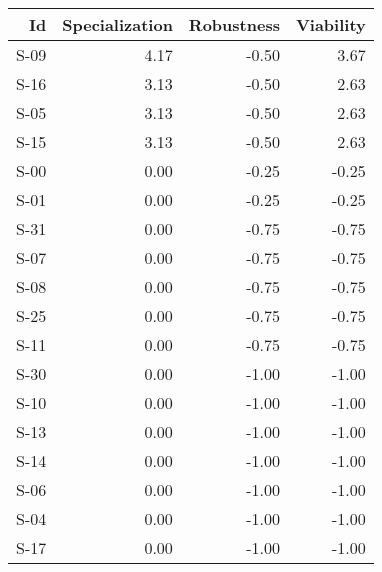 \begin{tabular}{ | r | r | r | r | }
    \hline
                    Id  &  Specialization  &      Robustness  &       Viability  \\
    \hline
    \hline
                  S-09  &            4.17  &           -0.50  &            3.67  \\
    \hline
                  S-16  &            3.13  &           -0.50  &            2.63  \\
    \hline
                  S-05  &            3.13  &           -0.50  &            2.63  \\
    \hline
                  S-15  &            3.13  &           -0.50  &            2.63  \\
    \hline
                  S-00  &            0.00  &           -0.25  &           -0.25  \\
    \hline
                  S-01  &            0.00  &           -0.25  &           -0.25  \\
    \hline
                  S-31  &            0.00  &           -0.75  &           -0.75  \\
    \hline
                  S-07  &            0.00  &           -0.75  &           -0.75  \\
    \hline
                  S-08  &            0.00  &           -0.75  &           -0.75  \\
    \hline
                  S-25  &            0.00  &           -0.75  &           -0.75  \\
    \hline
                  S-11  &            0.00  &           -0.75  &           -0.75  \\
    \hline
                  S-30  &            0.00  &           -1.00  &           -1.00  \\
    \hline
                  S-10  &            0.00  &           -1.00  &           -1.00  \\
    \hline
                  S-13  &            0.00  &           -1.00  &           -1.00  \\
    \hline
                  S-14  &            0.00  &           -1.00  &           -1.00  \\
    \hline
                  S-06  &            0.00  &           -1.00  &           -1.00  \\
    \hline
                  S-04  &            0.00  &           -1.00  &           -1.00  \\
    \hline
                  S-17  &            0.00  &           -1.00  &           -1.00  \\

\end{tabular}
